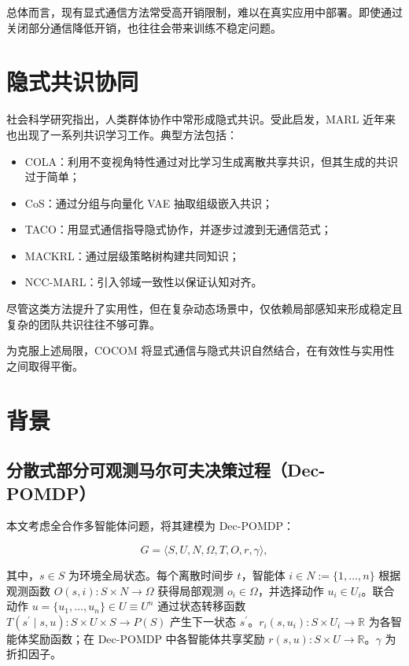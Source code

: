 总体而言，现有显式通信方法常受高开销限制，难以在真实应用中部署。即使通过关闭部分通信降低开销，也往往会带来训练不稳定问题。

\section*{隐式共识协同}

社会科学研究指出，人类群体协作中常形成隐式共识。受此启发，MARL 近年来也出现了一系列共识学习工作。典型方法包括：

\begin{itemize}
    \item COLA：利用不变视角特性通过对比学习生成离散共享共识，但其生成的共识过于简单；
    \item CoS：通过分组与向量化 VAE 抽取组级嵌入共识；
    \item TACO：用显式通信指导隐式协作，并逐步过渡到无通信范式；
    \item MACKRL：通过层级策略树构建共同知识；
    \item NCC-MARL：引入邻域一致性以保证认知对齐。
\end{itemize}

尽管这类方法提升了实用性，但在复杂动态场景中，仅依赖局部感知来形成稳定且复杂的团队共识往往不够可靠。

为克服上述局限，COCOM 将显式通信与隐式共识自然结合，在有效性与实用性之间取得平衡。

\section*{背景}

\subsection*{分散式部分可观测马尔可夫决策过程（Dec-POMDP）}

本文考虑全合作多智能体问题，将其建模为 Dec-POMDP：

\[
G=\langle S,U,N,\Omega,T,O,r,\gamma\rangle,
\]

其中，$s\in S$ 为环境全局状态。每个离散时间步 $t$，智能体 $i\in N:=\{1,\ldots,n\}$ 根据观测函数 $O(s,i):S\times N\to\Omega$ 获得局部观测 $o_i\in\Omega$，并选择动作 $u_i\in U_i$。联合动作 $u=\{u_1,\ldots,u_n\}\in U\equiv U^n$ 通过状态转移函数 $T(s^{\prime}\mid s,u):S\times U\times S\to P(S)$ 产生下一状态 $s^{\prime}$。$r_i(s,u_i):S\times U_i\to\mathbb{R}$ 为各智能体奖励函数；在 Dec-POMDP 中各智能体共享奖励 $r(s,u):S\times U\to\mathbb{R}$。$\gamma$ 为折扣因子。

